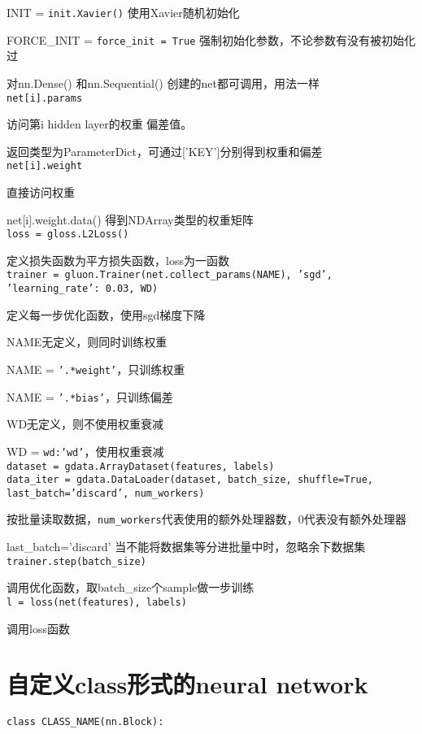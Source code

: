 \documentclass[UTF8]{ctexart}
\begin{document}
  INIT = \texttt{init.Xavier()} 使用Xavier随机初始化
  
  FORCE\_INIT = \texttt{force\_init = True} 强制初始化参数，不论参数有没有被初始化过
  
  对nn.Dense() 和nn.Sequential() 创建的net都可调用，用法一样\\
\texttt{net[i].params}

  访问第i hidden layer的权重 偏差值。
  
  返回类型为ParameterDict，可通过['KEY']分别得到权重和偏差\\
\texttt{net[i].weight} 
  
  直接访问权重

  net[i].weight.data() 得到NDArray类型的权重矩阵\\
\texttt{loss = gloss.L2Loss()}
  
  定义损失函数为平方损失函数，loss为一函数\\
\texttt{trainer = gluon.Trainer(net.collect\_params(NAME), 'sgd', {'learning\_rate': 0.03}, WD)}

  定义每一步优化函数，使用sgd梯度下降
  
  NAME无定义，则同时训练权重
  
  \quad NAME = \texttt{'.*weight'}，只训练权重 
  
  \quad NAME = \texttt{'.*bias'}，只训练偏差
    
  WD无定义，则不使用权重衰减
  
  \quad WD = \texttt{wd:'wd'}，使用权重衰减\\
\texttt{dataset = gdata.ArrayDataset(features, labels)}\\
\texttt{data\_iter = gdata.DataLoader(dataset, batch\_size, shuffle=True, last\_batch='discard', num\_workers)}

  按批量读取数据，\texttt{num\_workers}代表使用的额外处理器数，0代表没有额外处理器
  
  last\_batch='discard' 当不能将数据集等分进批量中时，忽略余下数据集\\
\texttt{trainer.step(batch\_size)}

  调用优化函数，取batch\_size个sample做一步训练\\
\texttt{l = loss(net(features), labels)}

  调用loss函数

\section{自定义class形式的neural network}
\noindent \texttt{class CLASS\_NAME(nn.Block):}
\end{document}
